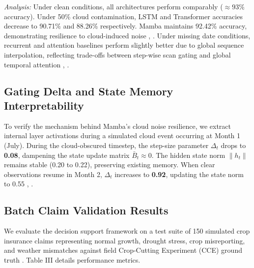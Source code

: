 \documentclass[conference]{IEEEtran}
\begin{document}
\textit{Analysis:} Under clean conditions, all architectures perform comparably ($\approx 93\%$ accuracy). Under 50\% cloud contamination, LSTM and Transformer accuracies decrease to 90.71\% and 88.26\% respectively. Mamba maintains 92.42\% accuracy, demonstrating resilience to cloud-induced noise \cite{b1}, \cite{b5}. Under missing date conditions, recurrent and attention baselines perform slightly better due to global sequence interpolation, reflecting trade-offs between step-wise scan gating and global temporal attention \cite{b3}, \cite{b15}.

\subsection{Gating Delta and State Memory Interpretability}
To verify the mechanism behind Mamba's cloud noise resilience, we extract internal layer activations during a simulated cloud event occurring at Month 1 (July). During the cloud-obscured timestep, the step-size parameter $\Delta_t$ drops to \textbf{0.08}, dampening the state update matrix $\bar{B}_t \approx 0$. The hidden state norm $\|h_t\|$ remains stable (0.20 to 0.22), preserving existing memory. When clear observations resume in Month 2, $\Delta_t$ increases to \textbf{0.92}, updating the state norm to 0.55 \cite{b1}, \cite{b5}.

\subsection{Batch Claim Validation Results}
We evaluate the decision support framework on a test suite of 150 simulated crop insurance claims representing normal growth, drought stress, crop misreporting, and weather mismatches against field Crop-Cutting Experiment (CCE) ground truth \cite{b2}. Table III details performance metrics.

\begin{table}[htbp]
\caption{Batch Claims Validation Performance Metrics}
\label{tab:claims_metrics}
\centering
{}
\end{table}
\end{document}
